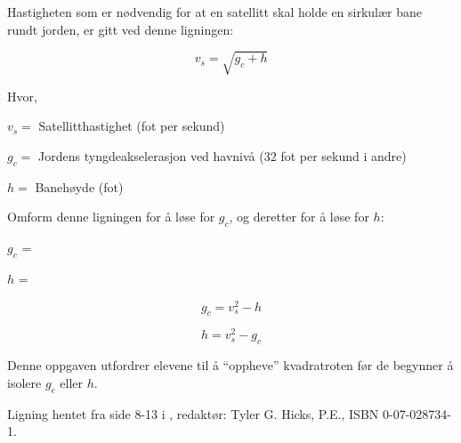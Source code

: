 

Hastigheten som er nødvendig for at en satellitt skal holde en sirkulær bane rundt jorden, er gitt ved denne ligningen:

$$v_s = \sqrt {g_c + h}$$

\noindent
Hvor,

$v_s =$ Satellitthastighet (fot per sekund)

$g_c =$ Jordens tyngdeakselerasjon ved havnivå (32 fot per sekund i andre)

$h =$ Banehøyde (fot)

\vskip 10pt

Omform denne ligningen for å løse for $g_c$, og deretter for å løse for $h$:

\vskip 10pt

$g_c$ =

\vskip 30pt

$h$ =






$$g_c = v_s^2 - h$$

\vskip 20pt

$$h = v_s^2 - g_c$$







Denne oppgaven utfordrer elevene til å ``oppheve'' kvadratroten før de begynner å isolere $g_c$ eller $h$.

\vskip 10pt

Ligning hentet fra side 8-13 i , redaktør: Tyler G. Hicks, P.E., ISBN 0-07-028734-1.



